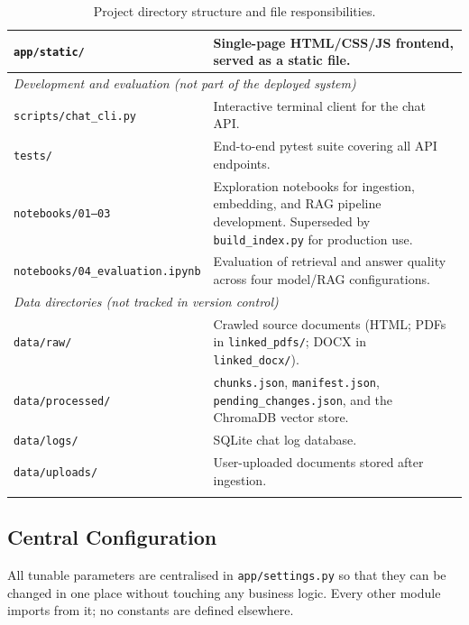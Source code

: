 \begin{longtable}{|l|p{}|}
    \hline
    \texttt{app/static/}           & Single-page HTML/CSS/JS frontend, served as a static file. \\
    \hline\hline
    \multicolumn{2}{|l|}{\textit{Development and evaluation (not part of the deployed system)}} \\
    \hline
    \texttt{scripts/chat\_cli.py}  & Interactive terminal client for the chat API. \\
    \hline
    \texttt{tests/}                & End-to-end pytest suite covering all API endpoints. \\
    \hline
    \texttt{notebooks/01--03}      & Exploration notebooks for ingestion, embedding, and RAG pipeline development. Superseded by \texttt{build\_index.py} for production use. \\
    \hline
    \texttt{notebooks/04\_evaluation.ipynb} & Evaluation of retrieval and answer quality across four model/RAG configurations. \\
    \hline\hline
    \multicolumn{2}{|l|}{\textit{Data directories (not tracked in version control)}} \\
    \hline
    \texttt{data/raw/}         & Crawled source documents (HTML; PDFs in \texttt{linked\_pdfs/}; DOCX in \texttt{linked\_docx/}). \\
    \hline
    \texttt{data/processed/}   & \texttt{chunks.json}, \texttt{manifest.json}, \texttt{pending\_changes.json}, and the ChromaDB vector store. \\
    \hline
    \texttt{data/logs/}        & SQLite chat log database. \\
    \hline
    \texttt{data/uploads/}     & User-uploaded documents stored after ingestion. \\
    \hline
    \caption{Project directory structure and file responsibilities.}
    \label{tab:structure}
\end{longtable}

\subsection{Central Configuration}
\label{sec:impl-config}

All tunable parameters are centralised in \texttt{app/settings.py} so that
they can be changed in one place without touching any business logic. Every
other module imports from it; no constants are defined elsewhere.

